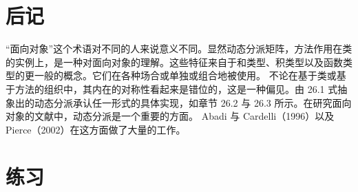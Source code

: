 \section{后记}

“面向对象”这个术语对不同的人来说意义不同。显然动态分派矩阵，方法作用在类的实例上，是一种对面向对象的理解。这些特征来自于和类型、积类型以及函数类型的更一般的概念。它们在各种场合或单独或组合地被使用。
不论在基于类或基于方法的组织中，其内在的对称性看起来是错位的，这是一种偏见。由 26.1 式抽象出的动态分派承认任一形式的具体实现，如章节 26.2 与 26.3 所示。在研究面向对象的文献中，动态分派是一个重要的方面。
Abadi 与 Cardelli（1996）以及 Pierce（2002）在这方面做了大量的工作。

\section{练习}

